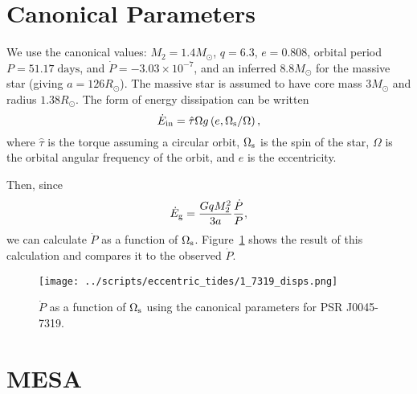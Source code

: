 \documentclass[11pt,
        usenames, %
        dvipsnames %
    ]{article}
\newcommand*{\p}[1]{\left(#1\right)}
\begin{document}
\section{Canonical Parameters}

We use the canonical values: $M_2 = 1.4M_{\odot}$, $q = 6.3$, $e = 0.808$,
orbital period $P = 51.17\;\mathrm{days}$, and $\dot{P} = -3.03\times 10^{-7}$,
and an inferred $8.8M_{\odot}$ for the massive star (giving $a = 126R_{\odot}$).
The massive star is assumed to have core mass $3M_{\odot}$ and radius
$1.38R_{\odot}$. The form of energy dissipation can be written
\begin{equation}
    \dot{E}_{\rm in} = \hat{\tau} \Omega g\p{e, \Omega_{\rm s} / \Omega},
\end{equation}
where $\hat{\tau}$ is the torque assuming a circular orbit, $\Omega_{\rm s}$ is
the spin of the star, $\Omega$ is the orbital angular frequency of the orbit,
and $e$ is the eccentricity.

Then, since
\begin{equation}
    \dot{E}_{\rm g} = \frac{GqM_2^2}{3a}\frac{\dot{P}}{P},
\end{equation}
we can calculate $\dot{P}$ as a function of $\Omega_{\rm s}$. Figure~\ref{fig:1}
shows the result of this calculation and compares it to the observed $\dot{P}$.
\begin{figure}[h]
    \centering
    \texttt{[image: ../scripts/eccentric\_tides/1\_7319\_disps.png]}
    \caption{$\dot{P}$ as a function of $\Omega_{\rm s}$ using the canonical
    parameters for PSR J0045-7319.}\label{fig:1}
\end{figure}

\section{MESA}
\end{document}
